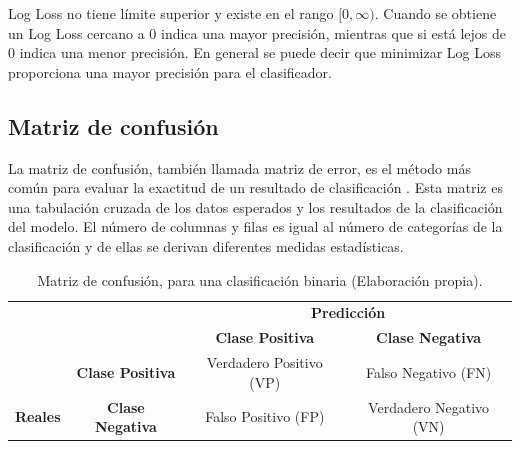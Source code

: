 \vspace{5mm} %

Log Loss no tiene l\'{i}mite superior y existe en el rango $[0, \infty )$. Cuando se obtiene un Log Loss cercano a 0 indica una mayor precisi\'{o}n, mientras que si est\'{a} lejos de 0 indica una menor precisi\'{o}n. En general se puede decir que minimizar Log Loss proporciona una mayor precisi\'{o}n para el clasificador.

\subsection{Matriz de confusi\'{o}n}

La matriz de confusi\'{o}n, tambi\'{e}n llamada matriz de error, es el m\'{e}todo m\'{a}s com\'{u}n para evaluar la exactitud de un resultado de clasificaci\'{o}n \cite{Reference61}. Esta matriz es una tabulaci\'{o}n cruzada de los datos esperados y los resultados de la clasificaci\'{o}n del modelo. El n\'{u}mero de columnas y filas es igual al n\'{u}mero de categor\'{i}as de la clasificaci\'{o}n y de ellas se derivan diferentes medidas estad\'{i}sticas.

\begin{table}[H]

\centering
\begin{center}
\begin{tabular}{ll|c|c|}
\cline{3-4}
                                                        &                                              & \multicolumn{2}{c|}{\textbf{Predicci\'{o}n}}                                                          \\ \cline{3-4} 
                                                        &                                              & \textbf{Clase Positiva}                         & \textbf{Clase Negativa}                         \\ \hline
\multicolumn{1}{|c|}{}                                  & \multicolumn{1}{c|}{\textbf{Clase Positiva}} & \cellcolor[HTML]{AADD99}Verdadero Positivo (VP) & \cellcolor[HTML]{FFCE93}Falso Negativo (FN)     \\ \cline{2-4} 
\multicolumn{1}{|c|}{\multirow{-2}{*}{\textbf{Reales}}} & \multicolumn{1}{c|}{\textbf{Clase Negativa}} & \cellcolor[HTML]{DF9F9F}Falso Positivo (FP)     & \cellcolor[HTML]{AADD99}Verdadero Negativo (VN) \\ \hline
\end{tabular}
\caption{Matriz de confusi\'{o}n, para una clasificaci\'{o}n binaria (Elaboraci\'{o}n propia).}
\label{table:matriz}
\end{center}
\end{table}

